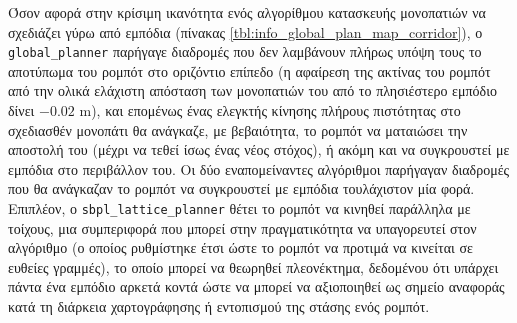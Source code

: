 Όσον αφορά στην κρίσιμη ικανότητα ενός αλγορίθμου κατασκευής μονοπατιών να
σχεδιάζει γύρω από εμπόδια (πίνακας
\ref{tbl:info_global_plan_map_corridor}), ο \texttt{global\_planner} παρήγαγε
διαδρομές που δεν λαμβάνουν πλήρως υπόψη τους το αποτύπωμα του ρομπότ στο
οριζόντιο επίπεδο (η αφαίρεση της ακτίνας του ρομπότ από την ολικά ελάχιστη
απόσταση των μονοπατιών του από το πλησιέστερο εμπόδιο δίνει $-0.02$ m), και
επομένως ένας ελεγκτής κίνησης πλήρους πιστότητας στο σχεδιασθέν μονοπάτι θα
ανάγκαζε, με βεβαιότητα, το ρομπότ να ματαιώσει την αποστολή του (μέχρι να
τεθεί ίσως ένας νέος στόχος), ή ακόμη και να συγκρουστεί με εμπόδια στο
περιβάλλον του. Οι δύο εναπομείναντες αλγόριθμοι παρήγαγαν διαδρομές που θα
ανάγκαζαν το ρομπότ να συγκρουστεί με εμπόδια τουλάχιστον μία φορά. Επιπλέον, ο
\texttt{sbpl\_lattice\_planner} θέτει το ρομπότ να κινηθεί παράλληλα με
τοίχους, μια συμπεριφορά που μπορεί στην πραγματικότητα να υπαγορευτεί στον
αλγόριθμο (ο οποίος ρυθμίστηκε έτσι ώστε το ρομπότ να προτιμά να κινείται
σε ευθείες γραμμές), το οποίο μπορεί να θεωρηθεί πλεονέκτημα, δεδομένου ότι
υπάρχει πάντα ένα εμπόδιο αρκετά κοντά ώστε να μπορεί να αξιοποιηθεί ως σημείο
αναφοράς κατά τη διάρκεια χαρτογράφησης ή εντοπισμού της στάσης ενός ρομπότ.


